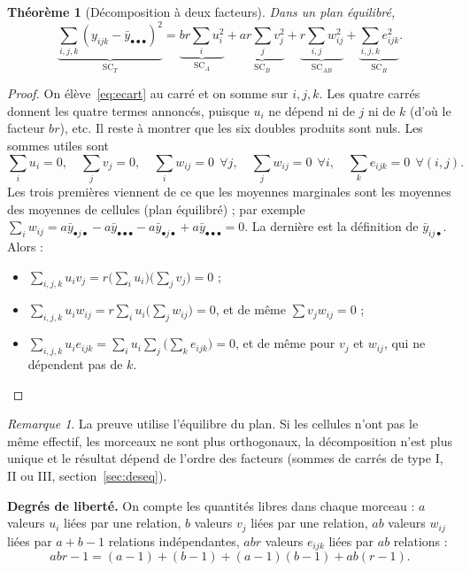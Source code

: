 \documentclass[11pt,a4paper]{article}
\theoremstyle{sj}
\newtheorem{thm}{Théorème}
\theoremstyle{definition}
\theoremstyle{remark}
\newtheorem*{rem}{Remarque}
\newcommand{\SC}{\mathrm{SC}}
\newcommand{\ybar}{\bar y}
\newcommand{\dotp}{{\scriptscriptstyle\bullet}}
\begin{document}
\begin{thm}[Décomposition à deux facteurs]\label{thm:dec2}
Dans un plan équilibré,
\[
\underbrace{\sum_{i,j,k}(y_{ijk}-\ybar_{\dotp\dotp\dotp})^2}_{\SC_T}
=\underbrace{br\sum_i u_i^2}_{\SC_A}+\underbrace{ar\sum_j v_j^2}_{\SC_B}+\underbrace{r\sum_{i,j}w_{ij}^2}_{\SC_{AB}}+\underbrace{\sum_{i,j,k}e_{ijk}^2}_{\SC_R}.
\]
\end{thm}

\begin{proof}
On élève~\eqref{eq:ecart} au carré et on somme sur $i,j,k$. Les quatre carrés donnent les quatre termes annoncés, puisque $u_i$ ne dépend ni de $j$ ni de $k$ (d'où le facteur $br$), etc. Il reste à montrer que les six doubles produits sont nuls. Les sommes utiles sont
\[
\textstyle\sum_i u_i=0,\quad \sum_j v_j=0,\quad \sum_i w_{ij}=0\ \ \forall j,\quad \sum_j w_{ij}=0\ \ \forall i,\quad \sum_k e_{ijk}=0\ \ \forall (i,j).
\]
Les trois premières viennent de ce que les moyennes marginales sont les moyennes des moyennes de cellules (plan équilibré) ; par exemple $\sum_i w_{ij}=a\ybar_{\dotp j\dotp}-a\ybar_{\dotp\dotp\dotp}-a\ybar_{\dotp j\dotp}+a\ybar_{\dotp\dotp\dotp}=0$. La dernière est la définition de $\ybar_{ij\dotp}$. Alors :
\begin{itemize}
\item $\sum_{i,j,k}u_iv_j=r\big(\sum_iu_i\big)\big(\sum_jv_j\big)=0$ ;
\item $\sum_{i,j,k}u_iw_{ij}=r\sum_iu_i\big(\sum_jw_{ij}\big)=0$, et de même $\sum v_jw_{ij}=0$ ;
\item $\sum_{i,j,k}u_ie_{ijk}=\sum_iu_i\sum_j\big(\sum_ke_{ijk}\big)=0$, et de même pour $v_j$ et $w_{ij}$, qui ne dépendent pas de $k$.\qedhere
\end{itemize}
\end{proof}

\begin{rem}
La preuve utilise l'équilibre du plan. Si les cellules n'ont pas le même effectif, les morceaux ne sont plus orthogonaux, la décomposition n'est plus unique et le résultat dépend de l'ordre des facteurs (sommes de carrés de type I, II ou III, section~\ref{sec:deseq}).
\end{rem}

\textbf{Degrés de liberté.} On compte les quantités libres dans chaque morceau : $a$ valeurs $u_i$ liées par une relation, $b$ valeurs $v_j$ liées par une relation, $ab$ valeurs $w_{ij}$ liées par $a+b-1$ relations indépendantes, $abr$ valeurs $e_{ijk}$ liées par $ab$ relations :
\[
abr-1=(a-1)+(b-1)+(a-1)(b-1)+ab(r-1).
\]
\end{document}
